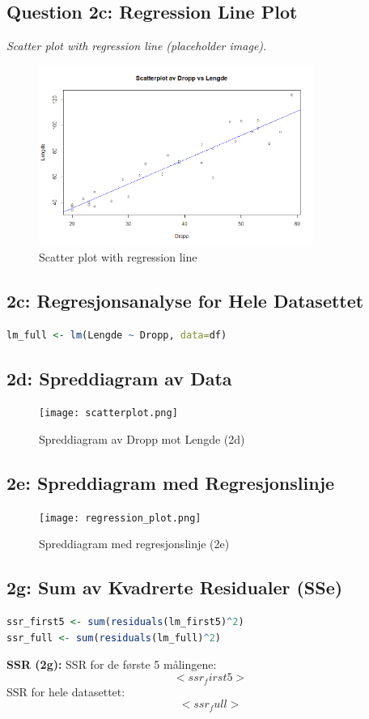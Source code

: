 \documentclass{article}
\begin{document}
\subsection{Question 2c: Regression Line Plot}
\textit{Scatter plot with regression line (placeholder image).}
\begin{figure}[h]
    \centering
    \includegraphics[width=0.8\textwidth]{Rplot02.png}
    \caption{Scatter plot with regression line}
\end{figure}

\subsection{2c: Regresjonsanalyse for Hele Datasettet}
\begin{lstlisting}[language=R]
lm_full <- lm(Lengde ~ Dropp, data=df)
\end{lstlisting}

\subsection{2d: Spreddiagram av Data}
\begin{figure}[h]
    \centering
    \texttt{[image: scatterplot.png]}
    \caption{Spreddiagram av Dropp mot Lengde (2d)}
\end{figure}

\subsection{2e: Spreddiagram med Regresjonslinje}
\begin{figure}[h]
    \centering
    \texttt{[image: regression\_plot.png]}
    \caption{Spreddiagram med regresjonslinje (2e)}
\end{figure}

\subsection{2g: Sum av Kvadrerte Residualer (SSe)}
\begin{lstlisting}[language=R]
ssr_first5 <- sum(residuals(lm_first5)^2)
ssr_full <- sum(residuals(lm_full)^2)
\end{lstlisting}
\textbf{SSR (2g):} SSR for de første 5 målingene: \[ <ssr_first5> \]
SSR for hele datasettet: \[ <ssr_full> \]
\end{document}
